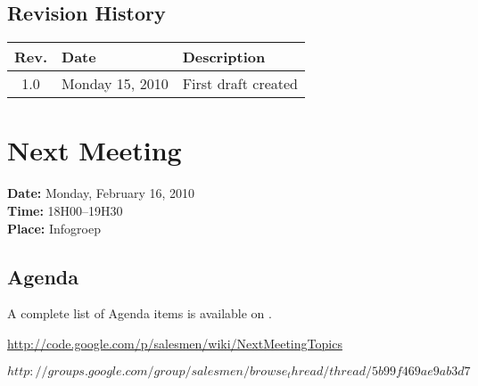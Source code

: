\documentclass[a4paper, 12pt]{article}
\begin{document}
		\subsection{Revision History}
			\begin{tabular}{c | l | l }
				\textbf{Rev.} & \textbf{Date} & \textbf{Description} \\
				\hline
				1.0 & Monday 15, 2010 & First draft created \\
			\end{tabular}		

	\section{}
	\section{Next Meeting}

		\textbf{Date:} Monday, February 16, 2010\\
		\textbf{Time:} 18H00--19H30\\
		\textbf{Place:} Infogroep\\
	
		\subsection{Agenda}
A complete list of Agenda items is available on \cite{agendaitems}.\\
	
	\begin{thebibliography}{99}
		
		\href{http://code.google.com/p/salesmen/wiki/NextMeetingTopics}{http://code.google.com/p/salesmen/wiki/NextMeetingTopics}

		\href{http://groups.google.com/group/salesmen/browse_thread/thread/5b99f469ae9ab3d7}{$http://groups.google.com/group/salesmen/browse_thread/thread/5b99f469ae9ab3d7$}
		
	\end{thebibliography}	
		
\end{document}
